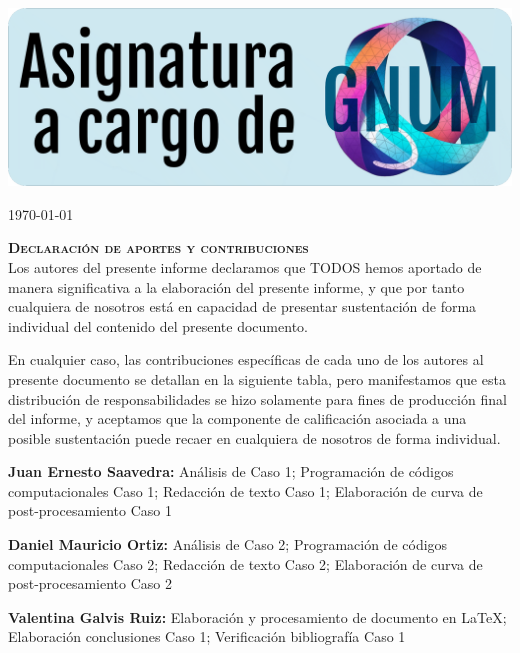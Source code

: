 \documentclass[11pt,stdletter,orderfromtodate,sigleft,twoside]{report}
\newenvironment{rightbox}[1]
 {\itemize[
    nosep,
    leftmargin=\dimexpr\textwidth-#1\relax,
    rightmargin=2pt,
    itemindent=\parindent,
    listparindent=\parindent,
  ]\item[]\relax}
 {\enditemize}
\begin{document}
\begin{titlepage}
\vfill
\begin{rightbox}{2.5cm}
    \includegraphics[width=0.95\linewidth]{./templateFigures/moduleOwnershipGNUM.png}
\end{rightbox}
\vfill

\today

\end{titlepage}
\newpage


\thispagestyle{declarationstyle}
\vspace*{12mm}
\begin{framed}
    {\Large \textbf{\textsc{Declaración de aportes y contribuciones}}}\\[8mm]

Los autores del presente informe declaramos que TODOS hemos aportado de manera
significativa a la elaboración del presente informe, y que por tanto cualquiera
de nosotros está en capacidad de presentar sustentación de forma individual del
contenido del presente documento.

En cualquier caso, las contribuciones específicas de cada uno de los autores al
presente documento se detallan en la siguiente tabla, pero manifestamos que
esta distribución de responsabilidades se hizo solamente para fines de
producción final del informe, y aceptamos que la componente de calificación
asociada a una posible sustentación puede recaer en cualquiera de nosotros de
forma individual.

\end{framed}

\vfill

\begin{framed}
    {\large \textbf{Juan Ernesto Saavedra:} An\'alisis de Caso 1; Programaci\'on de c\'odigos computacionales Caso 1; Redacci\'on de texto Caso 1; Elaboraci\'on de curva de post-procesamiento Caso 1}\\[2mm]
\end{framed}
\begin{framed}
    {\large \textbf{Daniel Mauricio Ortiz:} An\'alisis de Caso 2; Programaci\'on de c\'odigos computacionales Caso 2; Redacci\'on de texto Caso 2; Elaboraci\'on de curva de post-procesamiento Caso 2}\\[2mm]
\end{framed}
\begin{framed}
    {\large \textbf{Valentina Galvis Ruiz:} Elaboraci\'on y procesamiento de documento en \LaTeX ; Elaboraci\'on conclusiones Caso 1; Verificaci\'on bibliograf\'ia Caso 1}\\[2mm]
\end{framed}
\end{document}
